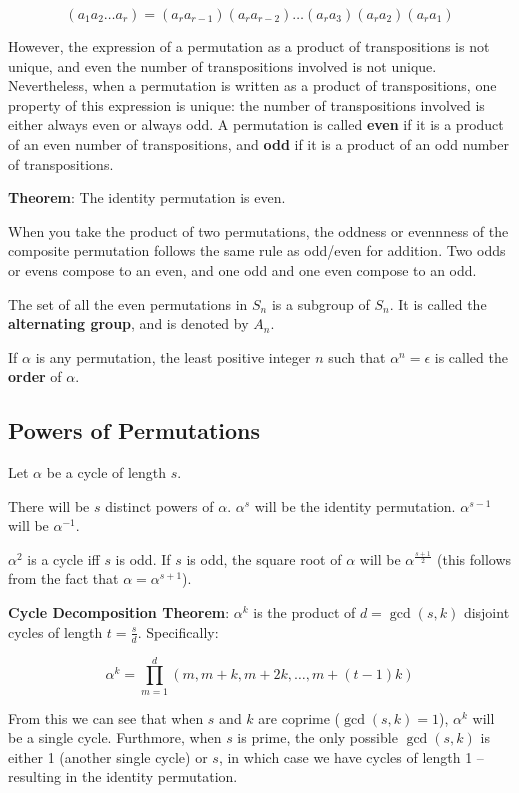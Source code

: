 \documentclass[11pt]{article}
\begin{document}
\[
\left(a_1 a_2 \ldots a_r\right)=\left(a_r a_{r-1}\right)\left(a_r a_{r-2}\right) \ldots\left(a_r a_3\right)\left(a_r a_2\right)\left(a_r a_1\right)
\]

However, the expression of a permutation as a product of transpositions
is not unique, and even the number of transpositions involved is not
unique. Nevertheless, when a permutation is written as a product of
transpositions, one property of this expression is unique: the number of
transpositions involved is either always even or always odd. A
permutation is called \textbf{even} if it is a product of an even number
of transpositions, and \textbf{odd} if it is a product of an odd number
of transpositions.

\textbf{Theorem}: The identity permutation is even.

When you take the product of two permutations, the oddness or evennness
of the composite permutation follows the same rule as odd/even for
addition. Two odds or evens compose to an even, and one odd and one even
compose to an odd.

The set of all the even permutations in \(S_n\) is a subgroup of
\(S_n\). It is called the \textbf{alternating group}, and is denoted by
\(A_n\).

If \(\alpha\) is any permutation, the least positive integer \(n\) such
that \(\alpha^n = \epsilon\) is called the \textbf{order} of \(\alpha\).

\subsection{Powers of Permutations}\label{powers-of-permutations}

Let \(\alpha\) be a cycle of length \(s\).

There will be \(s\) distinct powers of \(\alpha\). \(\alpha^{s}\) will
be the identity permutation. \(\alpha^{s-1}\) will be \(\alpha^{-1}\).

\(\alpha^2\) is a cycle iff \(s\) is odd. If \(s\) is odd, the square
root of \(\alpha\) will be \(\alpha^{\frac{s+1}{2}}\) (this follows from
the fact that \(\alpha = \alpha^{s+1}\)).

\textbf{Cycle Decomposition Theorem}: \(\alpha^k\) is the product of
\(d=\operatorname{gcd}(s, k)\) disjoint cycles of length
\(t=\frac{s}{d}\). Specifically:

\[
\alpha^k=\prod_{m=1}^d(m, m+k, m+2 k, \ldots, m+(t-1) k)
\]

From this we can see that when \(s\) and \(k\) are coprime
(\(\operatorname{gcd}(s, k) = 1\)), \(\alpha^k\) will be a single cycle.
Furthmore, when \(s\) is prime, the only possible
\(\operatorname{gcd}(s, k)\) is either 1 (another single cycle) or
\(s\), in which case we have cycles of length 1 -- resulting in the
identity permutation.
\end{document}
